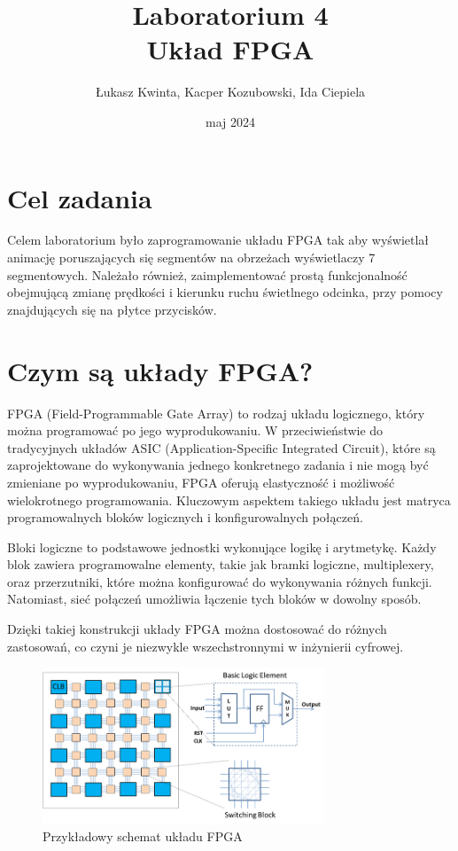 \documentclass[a4paper]{article}
\title{\fontsize{30pt}{30pt}\selectfont Laboratorium 4 \\ Układ FPGA}
\author{\fontsize{20pt}{20pt}\selectfont Łukasz Kwinta, Kacper Kozubowski, Ida Ciepiela}
\date{maj 2024}
\begin{document}
\maketitle
\pagebreak
\large
\tableofcontents

\pagebreak
\section{Cel zadania}
\Large
Celem laboratorium było zaprogramowanie układu FPGA tak aby wyświetlał animację poruszających się 
segmentów na obrzeżach wyświetlaczy 7 segmentowych. Należało również, zaimplementować prostą funkcjonalność 
obejmującą zmianę prędkości i kierunku ruchu świetlnego odcinka, przy pomocy znajdujących się na płytce przycisków.  

\section{Czym są układy FPGA?}
FPGA (Field-Programmable Gate Array) to rodzaj układu logicznego,
który można programować po jego wyprodukowaniu. W przeciwieństwie do tradycyjnych układów ASIC (Application-Specific Integrated Circuit), 
które są zaprojektowane do wykonywania jednego konkretnego zadania i nie mogą być zmieniane po wyprodukowaniu, 
FPGA oferują elastyczność i możliwość wielokrotnego programowania. 
Kluczowym aspektem takiego układu jest matryca programowalnych bloków logicznych i konfigurowalnych połączeń.

Bloki logiczne to podstawowe jednostki wykonujące logikę i arytmetykę.
Każdy blok zawiera programowalne elementy, takie jak bramki logiczne,
multiplexery, oraz przerzutniki, które można konfigurować do wykonywania różnych funkcji.
Natomiast, sieć połączeń umożliwia łączenie tych bloków w dowolny sposób.

Dzięki takiej konstrukcji układy FPGA można dostosować do różnych zastosowań, 
co czyni je niezwykle wszechstronnymi w inżynierii cyfrowej.

\begin{figure}[H]
    \centering
    \includegraphics[width=0.75\textwidth]{FPGA_diagram.png}
    \caption{Przykładowy schemat układu FPGA}
\end{figure}
\end{document}
